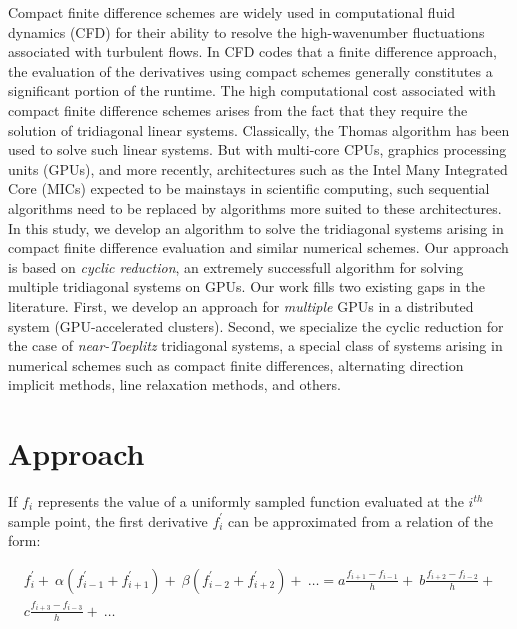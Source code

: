 \documentclass[letterpaper,10pt]{article}
\begin{document}
Compact finite difference schemes are widely used
in computational fluid dynamics (CFD)
for their ability to resolve the high-wavenumber fluctuations
associated with turbulent flows.
In CFD codes that a finite difference approach,
the evaluation of the derivatives using compact schemes
generally constitutes a significant portion of the runtime.
The high computational cost associated with
compact finite difference schemes arises from the fact that they require
the solution of tridiagonal linear systems.
Classically, the Thomas algorithm has been used to solve such linear systems.
But with multi-core CPUs, graphics processing units (GPUs),
and more recently,
architectures such as the
Intel Many Integrated Core (MICs)
expected to be mainstays in scientific computing,
such sequential algorithms need to be
replaced by algorithms more suited to these architectures.
In this study,
we develop an algorithm to solve the tridiagonal systems
arising in compact finite difference evaluation
and similar numerical schemes.
Our approach is based on \emph{cyclic reduction},
an extremely successfull algorithm for solving multiple
tridiagonal systems on GPUs.
Our work fills two existing gaps in the literature.
First, we develop an approach for \emph{multiple} GPUs
in a distributed system (GPU-accelerated clusters).
Second, we specialize the cyclic reduction for the case
of \emph{near-Toeplitz} tridiagonal systems,
a special class of systems arising in numerical schemes
such as compact finite differences,
alternating direction implicit methods,
line relaxation methods, and others.
    
\section{Approach}

If $f_i$ represents the value of
a uniformly sampled function evaluated at the $i^{th}$ sample point,
the first derivative $f^{\prime}_i$ can be approximated from
a relation of the form:

%
\begin{equation}
\begin{split}
    f_i^{\prime} + \
    \alpha(f^{\prime}_{i-1} + f^{\prime}_{i+1}) + \
    \beta(f^{\prime}_{i-2} + f^{\prime}_{i+2}) + \
    \hdots
    = 
    a\frac{f_{i+1} - f_{i-1}}{h} + \
    b\frac{f_{i+2} - f_{i-2}}{h} + \\
    c\frac{f_{i+3} - f_{i-3}}{h} + \
    \hdots
\end{split}
\label{eqn:general-compact}
\end{equation}
%
\end{document}
